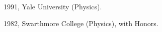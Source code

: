 \item[Ph.D.:] 1991, Yale University (Physics).
\item[B.A.:] 1982, Swarthmore College (Physics), with Honors.
